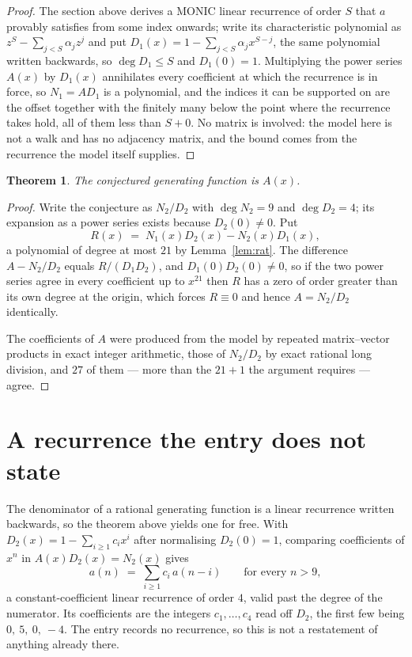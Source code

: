 \documentclass[11pt,a4paper]{article}
\theoremstyle{plain}
\newtheorem{theorem}{Theorem}
\theoremstyle{definition}
\begin{document}
\begin{proof}
The section above derives a MONIC linear recurrence of order $S$ that $a$ provably satisfies
from some index onwards; write its characteristic polynomial as $z^S-\sum_{j<S}\alpha_jz^j$
and put $D_1(x)=1-\sum_{j<S}\alpha_jx^{S-j}$, the same polynomial written backwards, so
$\deg D_1\le S$ and $D_1(0)=1$. Multiplying the power series $A(x)$ by $D_1(x)$ annihilates
every coefficient at which the recurrence is in force, so $N_1=AD_1$ is a polynomial, and the
indices it can be supported on are the offset together with the finitely many below the point
where the recurrence takes hold, all of them less than $S+0$. No matrix is involved: the
model here is not a walk and has no adjacency matrix, and the bound comes from the recurrence
the model itself supplies.
\end{proof}

\begin{theorem}
The conjectured generating function is $A(x)$.
\end{theorem}

\begin{proof}
Write the conjecture as $N_2/D_2$ with $\deg N_2=9$ and $\deg D_2=4$; its expansion as a
power series exists because $D_2(0)\neq0$. Put
\[
R(x)\;=\;N_1(x)D_2(x)-N_2(x)D_1(x),
\]
a polynomial of degree at most $21$ by Lemma~\ref{lem:rat}. The difference
$A-N_2/D_2$ equals $R/(D_1D_2)$, and $D_1(0)D_2(0)\neq0$, so if the two power series agree in
every coefficient up to $x^{21}$ then $R$ has a zero of order greater than its own
degree at the origin, which forces $R\equiv0$ and hence $A=N_2/D_2$ identically.

The coefficients of $A$ were produced from the model by repeated matrix--vector products in
exact integer arithmetic, those of $N_2/D_2$ by exact rational long division, and $27$
of them --- more than the $21+1$ the argument requires --- agree.
\end{proof}

\section{A recurrence the entry does not state}

The denominator of a rational generating function is a linear recurrence written backwards, so
the theorem above yields one for free. With $D_2(x)=1-\sum_{i\ge1}c_ix^i$ after normalising
$D_2(0)=1$, comparing coefficients of $x^n$ in $A(x)D_2(x)=N_2(x)$ gives
\[
a(n)\;=\;\sum_{i\ge1}c_i\,a(n-i)\qquad\text{for every }n>9,
\]
a constant-coefficient linear recurrence of order $4$, valid past the degree of the
numerator. Its coefficients are the integers $c_1,\dots,c_{4}$ read off $D_2$, the first few being $0,\ 5,\ 0,\ -4$. The entry records no recurrence, so this is not a restatement of anything
already there.
\end{document}
